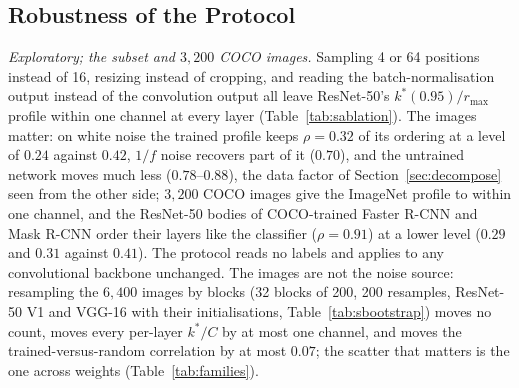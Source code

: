 \documentclass[10pt,journal,compsoc]{IEEEtran}
\begin{document}
\begin{table}[t]
  \caption{Estimator comparison on the same layers and images (plan Section~11; $894$ gate-passing dense convolutions, $19$ trained and $2$ random checkpoints). Level: median over layers of the estimator divided by $r_{\max}$ ($^\dagger$: $\alpha$ is a slope, reported raw). $\rho_{0.999}$, $\rho_{0.95}$: per-network Spearman correlation over layers between the estimator and $k^*(0.999)/r_{\max}$ or $k^*(0.95)/r_{\max}$, median across networks (and range); $\ge 0.8$ counts the networks with $|\rho_{0.999}| \ge 0.8$. Recipes: median pairwise $\rho$ between the six ResNet-50 recipes. PR$_{\rm corr}$ is the row-corrected participation ratio of Chun \emph{et al.} \cite{chun2026estimating} in its Gaussian closed form.}
  \label{tab:sestimators}
  \centering
  \scriptsize
  \setlength{\tabcolsep}{3.5pt}
  
\end{table}

\begin{table}[t]
  \centering
  \caption{Robustness of the $k^*(0.95)/r_{\max}$ profile of ResNet-50 (V1)
  to the protocol's choices, and its transfer to other images and to
  COCO-trained backbones. $\rho$: Spearman across layers against the
  reference run (6,400 ImageNet images, 16 positions, centre crop,
  convolution output); $|\Delta|$: per-layer absolute difference. The noise
  rows for the random initialisation are compared with that
  initialisation's ImageNet profile.}
  \label{tab:sablation}
  \footnotesize
  
\end{table}

\subsection*{Robustness of the Protocol}
\label{sec:robust}

\emph{Exploratory; the subset and $3{,}200$ COCO images.} Sampling 4 or
64 positions instead of 16, resizing instead of cropping, and reading the
batch-normalisation output instead of the convolution output all leave
ResNet-50's $k^*(0.95)/r_{\max}$ profile within one channel at every
layer (Table~\ref{tab:sablation}). The images matter: on white noise the
trained profile keeps $\rho = 0.32$ of its ordering at a level of $0.24$
against $0.42$, $1/f$ noise recovers part of it ($0.70$), and the
untrained network moves much less ($0.78$--$0.88$), the data factor of
Section~\ref{sec:decompose} seen from the other side; $3{,}200$ COCO
images give the ImageNet profile to within one channel, and the ResNet-50
bodies of COCO-trained Faster R-CNN and Mask R-CNN order their layers
like the classifier ($\rho = 0.91$) at a lower level ($0.29$ and $0.31$
against $0.41$). The protocol reads no labels and applies to any
convolutional backbone unchanged. The images are not the noise source:
resampling the $6{,}400$ images by blocks (32 blocks of 200, 200
resamples, ResNet-50 V1 and VGG-16 with their initialisations,
Table~\ref{tab:sbootstrap}) moves no count, moves every per-layer
$k^*/C$ by at most one channel, and moves the trained-versus-random
correlation by at most $0.07$; the scatter that matters is the one across
weights (Table~\ref{tab:families}).
\end{document}
